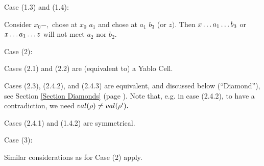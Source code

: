 Case (1.3) and (1.4):

Consider $x_{0}-,$ chose at $x_{0}$ $a_{1}$ and chose at $a_{1}$ $b_{3}$
(or $z).$ Then
$x \ldots a_{1} \ldots b_{3}$ or $x \ldots a_{1} \ldots z$ will not meet $a_{2}$ nor
$b_{2}.$

 \xDH Case (2):

Cases (2.1) and (2.2) are (equivalent to) a Yablo Cell.

Cases (2.3), (2.4.2), and (2.4.3) are equivalent, and discussed below
(``Diamond''),
see Section \ref{Section Diamonds} (page \pageref{Section Diamonds}).
Note that, e.g. in case (2.4.2), to have a contradiction, we need
$val(\rho) \neq val(\rho').$

Cases (2.4.1) and (1.4.2) are symmetrical.

 \xDH Case (3):

Similar considerations as for Case (2) apply.

 \xEj


\clearpage


